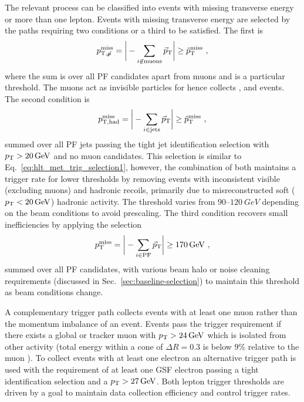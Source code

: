 The relevant process can be classified into events with missing transverse
energy or more than one lepton. Events with missing transverse energy are
selected by the \SWT paths requiring two conditions or a third to be
satisfied. The first is
%
\begin{equation}\label{eq:hlt_met_trig_selection1}
    p_{\text{T,}\not\mu}^{\mathrm{miss}} = \bigg| -\sum_{i\not\in\mathrm{muons}} \vec{p}_{\mathrm{T}} \bigg| \ge \hat{p}_{\text{T}}^{\mathrm{miss}}\ ,
\end{equation}
%
where the sum is over all PF candidates apart from muons and \ptmissthresh is
a particular threshold. The muons act as invisible particles for \ptmissnomu
hence collects \IZvv, \IWmv and \IDYmm events. The second condition is
%
\begin{equation}
    p_{\mathrm{T,had}}^{\mathrm{miss}} = \bigg| -\sum_{i\in\mathrm{jets}} \vec{p}_{\mathrm{T}} \bigg| \ge \ptmissthresh\ ,
\end{equation}
%
summed over all PF jets passing the tight jet identification selection with
${p_{\text{T}}>\SI{20}{GeV}}$ and no muon candidates. This selection is similar to
Eq.~\ref{eq:hlt_met_trig_selection1}, however, the combination of both
maintains a trigger rate for lower \ptmissthresh  thresholds by removing
events with inconsistent visible (excluding muons) and hadronic recoils,
primarily due to misreconstructed soft (${p_{\text{T}}<\SI{20}{GeV}}$) hadronic
activity. The threshold \ptmissthresh varies from {$90$--$\SI{120}{GeV}$}
depending on the \LHC beam conditions to avoid prescaling. The third condition
recovers small inefficiencies by applying the selection
%
\begin{equation}
    p_{\text{T}}^{\mathrm{miss}} = \bigg| -\sum_{i\in\mathrm{PF}} \vec{p}_{\mathrm{T}} \bigg| \ge \SI{170}{GeV}\ ,
\end{equation}
%
summed over all PF candidates, with various beam halo or \HCAL noise cleaning
requirements (discussed in Sec.~\ref{sec:baseline-selection}) to maintain this
threshold as beam conditions change.

A complementary trigger path collects events with at least one muon rather
than the momentum imbalance of an event. Events pass the trigger requirement
if there exists a global or tracker muon with ${p_{\text{T}}>\SI{24}{GeV}}$ which is
isolated from other activity (total energy within a cone of $\Delta R=0.3$ is
below $9\%$ relative to the muon \pt). To collect events with at least one
electron an alternative trigger path is used with the requirement of at least
one GSF electron passing a tight identification selection and a
${p_{\text{T}}>\SI{27}{GeV}}$. Both lepton trigger thresholds are driven by a goal to
maintain data collection efficiency and control trigger rates.


